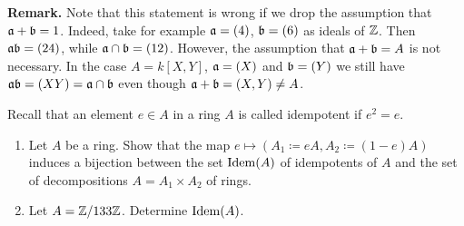 \documentclass[a4paper,11pt]{article}
\begin{document}
\textbf{Remark.} Note that this statement
is wrong if we drop the assumption that $\mathfrak{a} + \mathfrak{b} = 1$. Indeed, take for 
example $\mathfrak{a} = (4)$, $\mathfrak{b} = (6)$ as ideals of $\mathbb{Z}$. Then $\mathfrak{a} \mathfrak{b} = (24)$, 
while $\mathfrak{a} \cap \mathfrak{b} = (12)$. However, the assumption that $\mathfrak{a} + \mathfrak{b} = A$ is 
not necessary. In the case $A = k[X,Y]$, $\mathfrak{a} = (X)$ and $\mathfrak{b} = (Y)$ we still 
have $\mathfrak{a} \mathfrak{b} = (XY) = \mathfrak{a} \cap \mathfrak{b}$ even though $\mathfrak{a} + \mathfrak{b} = (X,Y) \neq A$.


Recall that an element $e \in A$ in a ring $A$ is called idempotent if $e^2 = e$. 
\begin{enumerate}
    \item Let $A$ be a ring. Show that the map $e \mapsto (A_1 \coloneqq eA,
        A_2 \coloneqq (1-e)A)$ induces a bijection between the set $\operatorname{Idem}(A)$
        of idempotents of $A$
        and the set of decompositions $A = A_1 \times A_2$ of rings. 
    \item Let $A = \mathbb{Z}/133\mathbb{Z}$. Determine $\operatorname{Idem}(A)$. 
\end{enumerate}
\end{document}
